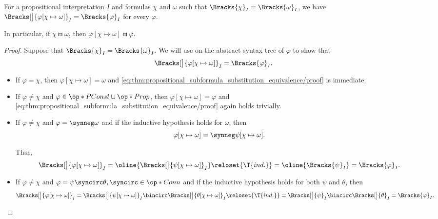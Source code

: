 \begin{proposition}\label{thm:propositional_subformula_substitution_equivalence}
  For a \hyperref[def:propositional_interpretation]{propositional interpretation} \( I \) and formulas \( \chi \) and \( \omega \) such that \( \Bracks{\chi}_I = \Bracks{\omega}_I \), we have \( \Bracks[\big]{\varphi[\chi \mapsto \omega]}_I = \Bracks{\varphi}_I \) for every \( \varphi \).

  In particular, if \( \chi \gleichstark \omega \), then \( \varphi[\chi \mapsto \omega] \gleichstark \varphi \).
\end{proposition}
\begin{proof}
  Suppose that \( \Bracks{\chi}_I = \Bracks{\omega}_I \). We will use  on the abstract syntax tree of \( \varphi \) to show that
  \begin{equation}\label{eq:thm:propositional_subformula_substitution_equivalence/proof}
    \Bracks[\big]{\varphi[\chi \mapsto \omega]}_I = \Bracks{\varphi}_I.
  \end{equation}

  \begin{itemize}
    \item If \( \varphi = \chi \), then \( \varphi[\chi \mapsto \omega] = \omega \) and \eqref{eq:thm:propositional_subformula_substitution_equivalence/proof} is immediate.

    \item If \( \varphi \neq \chi \) and \( \varphi \in \op*{PConst} \cup \op*{Prop} \), then \( \varphi[\chi \mapsto \omega] = \varphi \) and \eqref{eq:thm:propositional_subformula_substitution_equivalence/proof} again holds trivially.

    \item If \( \varphi \neq \chi \) and \( \varphi = \synneg \omega \) and if the inductive hypothesis holds for \( \omega \), then
    \begin{equation*}
      \varphi[\chi \mapsto \omega] = \synneg \psi[\chi \mapsto \omega].
    \end{equation*}

    Thus,
    \begin{equation*}
      \Bracks[\big]{ \varphi[\chi \mapsto \omega] }_I
      =
      \oline{\Bracks[\big]{\psi[\chi \mapsto \omega] }_I}
      \reloset {\T{ind.}} =
      \oline{\Bracks{\psi}_I}
      =
      \Bracks{\varphi}_I.
    \end{equation*}

    \item If \( \varphi \neq \chi \) and \( \varphi = \psi \syncirc \theta, {\syncirc} \in \op*{Conn} \) and if the inductive hypothesis holds for both \( \psi \) and \( \theta \), then
    \begin{equation*}
      \Bracks[\big]{ \varphi[\chi \mapsto \omega] }_I
      =
      \Bracks[\big]{ \psi[\chi \mapsto \omega] }_I \bincirc \Bracks[\big]{ \theta[\chi \mapsto \omega] }_I
      \reloset {\T{ind.}} =
      \Bracks[\big]{\psi}_I \bincirc \Bracks[\big]{\theta}_I
      =
      \Bracks{\varphi}_I.
    \end{equation*}
  \end{itemize}


\end{proof}
